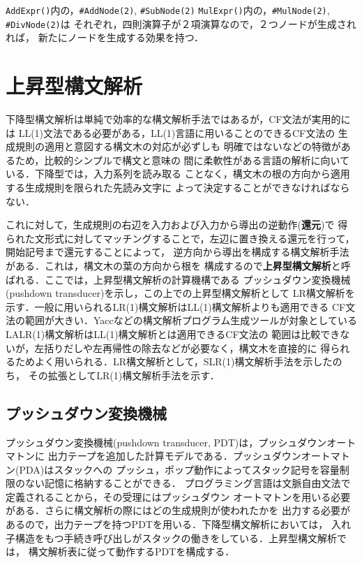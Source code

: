 \documentclass[dvipdfmx,a4j]{jbook}
\begin{document}
\texttt{AddExpr()}内の，\verb|#AddNode(2)|, \verb|#SubNode(2)|
\texttt{MulExpr()}内の，\verb|#MulNode(2)|, \verb|#DivNode(2)|は
それぞれ，四則演算子が２項演算なので，２つノードが生成されれば，
新たにノードを生成する効果を持つ．

\section{上昇型構文解析}

下降型構文解析は単純で効率的な構文解析手法ではあるが，CF文法が実用的には
LL(1)文法である必要がある，LL(1)言語に用いることのできるCF文法の
生成規則の適用と意図する構文木の対応が必ずしも
明確ではないなどの特徴があるため，比較的シンプルで構文と意味の
間に柔軟性がある言語の解析に向いている．下降型では，入力系列を読み取る
ことなく，構文木の根の方向から適用する生成規則を限られた先読み文字に
よって決定することができなければならない．

これに対して，生成規則の右辺を入力および入力から導出の逆動作({\bf 還元})で
得られた文形式に対してマッチングすることで，左辺に置き換える還元を行って，
開始記号まで還元することによって，
逆方向から導出を構成する構文解析手法がある．これは，構文木の葉の方向から根を
構成するので{\bf 上昇型構文解析}と呼ばれる．ここでは，上昇型構文解析の計算機構である
プッシュダウン変換機械(pushdown transducer)を示し，この上での上昇型構文解析として
LR構文解析を示す．一般に用いられるLR(1)構文解析はLL(1)構文解析よりも適用できる
CF文法の範囲が大きい．Yaccなどの構文解析プログラム生成ツールが対象としている
LALR(1)構文解析はLL(1)構文解析とは適用できるCF文法の
範囲は比較できないが，左括りだしや左再帰性の除去などが必要なく，構文木を直接的に
得られるためよく用いられる．LR構文解析として，SLR(1)構文解析手法を示したのち，
その拡張としてLR(1)構文解析手法を示す．

\subsection{プッシュダウン変換機械}

プッシュダウン変換機械(pushdown transducer, PDT)は，プッシュダウンオートマトンに
出力テープを追加した計算モデルである．プッシュダウンオートマトン(PDA)はスタックへの
プッシュ，ポップ動作によってスタック記号を容量制限のない記憶に格納することができる．
プログラミング言語は文脈自由文法で定義されることから，その受理にはプッシュダウン
オートマトンを用いる必要がある．さらに構文解析の際にはどの生成規則が使われたかを
出力する必要があるので，出力テープを持つPDTを用いる．下降型構文解析においては，
入れ子構造をもつ手続き呼び出しがスタックの働きをしている．上昇型構文解析では，
構文解析表に従って動作するPDTを構成する．
\end{document}
